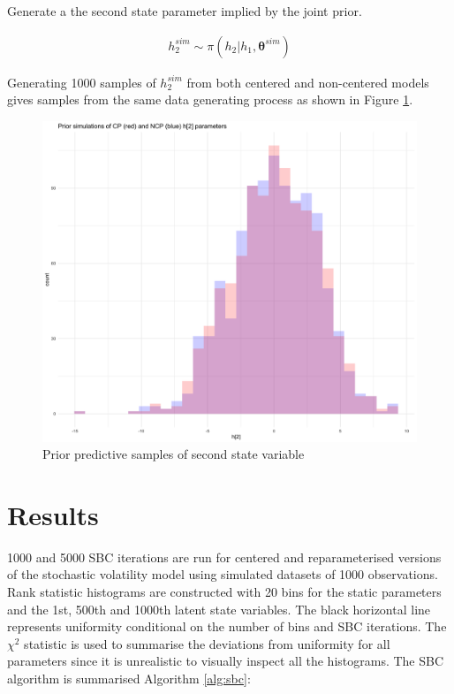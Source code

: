 \documentclass[12pt, a4paper]{article}
\begin{document}
        Generate a the second state parameter implied by the joint prior.

        $$
        \begin{aligned}
        h_2^{sim} \sim \pi (h_2|h_1, \boldsymbol{\theta}^{sim})
        \end{aligned}
        $$

        Generating 1000 samples of $h_2^{sim}$ from both centered and non-centered models gives samples from the same data generating process as shown in Figure \ref{fig:priorpred}. 


        \begin{figure}[h]
            \centering
            \includegraphics[scale=0.1]{figures/ppc_h2.png}
            \caption{Prior predictive samples of second state variable}
            \label{fig:priorpred}
        \end{figure}
        



\section{Results}
    1000 and 5000 SBC iterations are run for centered and reparameterised versions of the stochastic volatility model using simulated datasets of 1000 observations. Rank statistic histograms are constructed with 20 bins for the static parameters and the 1st, 500th and 1000th latent state variables. The black horizontal line represents uniformity conditional on the number of bins and SBC iterations. The $\chi^2$ statistic is used to summarise the deviations from uniformity for all parameters since it is unrealistic to visually inspect all the histograms. The SBC algorithm is summarised Algorithm \ref{alg:sbc}:
\end{document}
